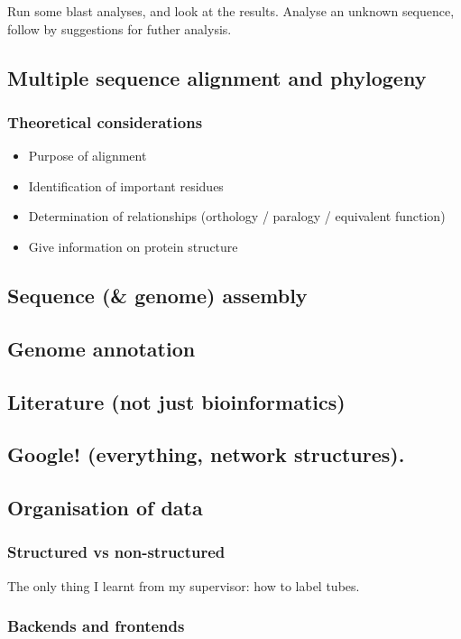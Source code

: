 \documentclass{scrartcl}
\begin{document}
Run some blast analyses, and look at the results.
Analyse an unknown sequence, follow by suggestions for futher analysis.
\subsection{Multiple sequence alignment and phylogeny}
\label{sec-4-3}
\subsubsection{Theoretical considerations}
\label{sec-4-3-1}

\begin{itemize}
\item Purpose of alignment
\item Identification of important residues
\item Determination of relationships (orthology / paralogy / equivalent function)
\item Give information on protein structure
\end{itemize}
\subsection{Sequence (\& genome) assembly}
\label{sec-4-4}
\subsection{Genome annotation}
\label{sec-4-5}
\subsection{Literature (not just bioinformatics)}
\label{sec-4-6}
\subsection{Google! (everything, network structures).}
\label{sec-4-7}
\subsection{Organisation of data}
\label{sec-4-8}
\subsubsection{Structured vs non-structured}
\label{sec-4-8-1}

    The only thing I learnt from my supervisor: how to label tubes.
\subsubsection{Backends and frontends}
\label{sec-4-8-2}
\end{document}
